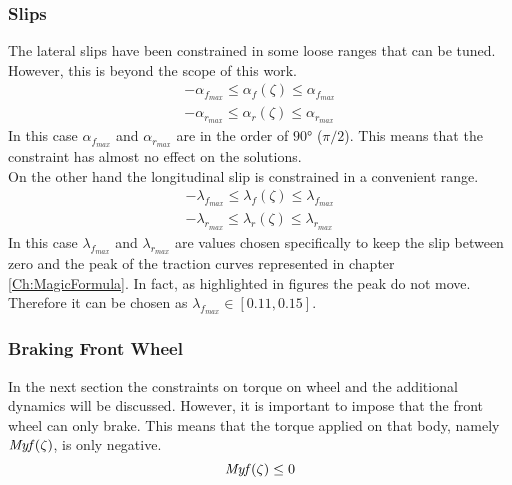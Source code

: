 \subsubsection*{Slips}
%
The lateral slips have been constrained in some loose ranges that can be tuned. However, this is beyond the scope of this work.
%
\begin{equation}
    \begin{array}{l}
        -\alpha_{f_{max}} \le \alpha_{f}(\zeta) \le \alpha_{f_{max}}\\
        -\alpha_{r_{max}} \le \alpha_{r}(\zeta) \le \alpha_{r_{max}}
    \end{array}
\end{equation}
%
In this case $\alpha_{f_{max}}$ and $\alpha_{r_{max}}$ are in the order of $90 \si{\degree}$ ($\pi/2$). This means that the constraint has almost no effect on the solutions.\\
On the other hand the longitudinal slip is constrained in a convenient range.
%
\begin{equation}
    \begin{array}{l}
        -\lambda_{f_{max}} \le \lambda_{f}(\zeta) \le \lambda_{f_{max}}\\
        -\lambda_{r_{max}} \le \lambda_{r}(\zeta) \le \lambda_{r_{max}}
    \end{array}
\end{equation}
In this case $\lambda_{f_{max}}$ and $\lambda_{r_{max}}$ are values chosen specifically to keep the slip between zero and the peak of the traction curves represented in chapter \ref{Ch:MagicFormula}. In fact, as highlighted in figures the peak do not move. Therefore it can be chosen as $\lambda_{f_{max}} \in [0.11,0.15]$. %
%
\subsubsection*{Braking Front Wheel}
%
In the next section the constraints on torque on wheel and the additional dynamics will be discussed. However, it is important to impose that the front wheel can only brake. This means that the torque applied on that body, namely ${\it Myf}(\zeta)$, is only negative.
%
\begin{equation}
    {\it Myf}(\zeta) \le 0
\end{equation}
%
